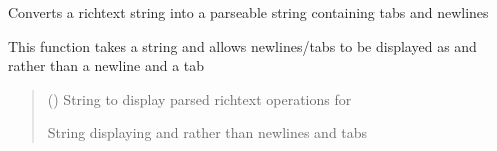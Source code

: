\documentclass[letterpaper,10pt,english]{sphinxmanual}
\begin{document}
\begin{fulllineitems}
\label{\detokenize{_autosummary/gmail_rules.utils.helpers:gmail_rules.utils.helpers.convert_to_parseable_string}}
\pysigstartsignatures
{}
\pysigstopsignatures
\sphinxAtStartPar
Converts a rich\sphinxhyphen{}text string into a parseable string containing tabs and newlines

\sphinxAtStartPar
This function takes a string and allows newlines/tabs to be displayed as  and 
rather than a newline and a tab
\begin{quote}\begin{description}
\sphinxAtStartPar
{} () \textendash{} String to display parsed richtext operations for

\sphinxAtStartPar
String displaying  and  rather than newlines and tabs

\sphinxAtStartPar
{}

\end{description}\end{quote}

\end{fulllineitems}

\end{document}
